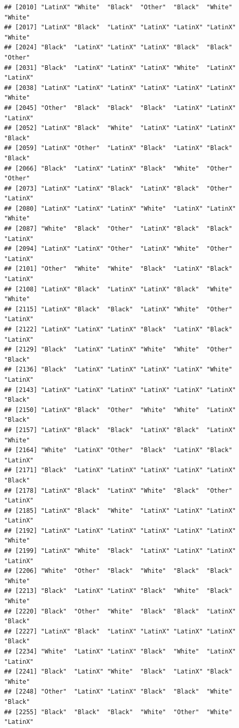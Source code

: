 \documentclass[]{book}
\begin{document}
\begin{verbatim}
## [2010] "LatinX" "White"  "Black"  "Other"  "Black"  "White"  "White" 
## [2017] "LatinX" "Black"  "LatinX" "LatinX" "LatinX" "LatinX" "White" 
## [2024] "Black"  "LatinX" "LatinX" "LatinX" "Black"  "Black"  "Other" 
## [2031] "Black"  "LatinX" "LatinX" "LatinX" "White"  "LatinX" "LatinX"
## [2038] "LatinX" "LatinX" "LatinX" "LatinX" "LatinX" "LatinX" "White" 
## [2045] "Other"  "Black"  "Black"  "Black"  "LatinX" "LatinX" "LatinX"
## [2052] "LatinX" "Black"  "White"  "LatinX" "LatinX" "LatinX" "Black" 
## [2059] "LatinX" "Other"  "LatinX" "Black"  "LatinX" "Black"  "Black" 
## [2066] "Black"  "LatinX" "LatinX" "Black"  "White"  "Other"  "Other" 
## [2073] "LatinX" "LatinX" "Black"  "LatinX" "Black"  "Other"  "LatinX"
## [2080] "LatinX" "LatinX" "LatinX" "White"  "LatinX" "LatinX" "White" 
## [2087] "White"  "Black"  "Other"  "LatinX" "Black"  "Black"  "LatinX"
## [2094] "LatinX" "LatinX" "Other"  "LatinX" "White"  "Other"  "LatinX"
## [2101] "Other"  "White"  "White"  "Black"  "LatinX" "Black"  "LatinX"
## [2108] "LatinX" "Black"  "LatinX" "LatinX" "Black"  "White"  "White" 
## [2115] "LatinX" "Black"  "Black"  "LatinX" "White"  "Other"  "LatinX"
## [2122] "LatinX" "LatinX" "LatinX" "Black"  "LatinX" "Black"  "LatinX"
## [2129] "Black"  "LatinX" "LatinX" "White"  "White"  "Other"  "Black" 
## [2136] "Black"  "LatinX" "LatinX" "LatinX" "LatinX" "White"  "LatinX"
## [2143] "LatinX" "LatinX" "LatinX" "LatinX" "LatinX" "LatinX" "Black" 
## [2150] "LatinX" "Black"  "Other"  "White"  "White"  "LatinX" "Black" 
## [2157] "LatinX" "Black"  "Black"  "LatinX" "Black"  "LatinX" "White" 
## [2164] "White"  "LatinX" "Other"  "Black"  "LatinX" "Black"  "LatinX"
## [2171] "Black"  "LatinX" "LatinX" "LatinX" "LatinX" "LatinX" "Black" 
## [2178] "LatinX" "Black"  "LatinX" "White"  "Black"  "Other"  "LatinX"
## [2185] "LatinX" "Black"  "White"  "LatinX" "LatinX" "LatinX" "LatinX"
## [2192] "LatinX" "LatinX" "LatinX" "LatinX" "LatinX" "LatinX" "White" 
## [2199] "LatinX" "White"  "Black"  "LatinX" "LatinX" "LatinX" "LatinX"
## [2206] "White"  "Other"  "Black"  "White"  "Black"  "Black"  "White" 
## [2213] "Black"  "LatinX" "LatinX" "Black"  "White"  "Black"  "White" 
## [2220] "Black"  "Other"  "White"  "Black"  "Black"  "LatinX" "Black" 
## [2227] "LatinX" "Black"  "LatinX" "LatinX" "LatinX" "LatinX" "Black" 
## [2234] "White"  "LatinX" "LatinX" "Black"  "White"  "LatinX" "LatinX"
## [2241] "Black"  "LatinX" "White"  "Black"  "LatinX" "Black"  "White" 
## [2248] "Other"  "LatinX" "LatinX" "Black"  "Black"  "White"  "Black" 
## [2255] "Black"  "Black"  "Black"  "White"  "Other"  "White"  "LatinX"

\end{verbatim}
\end{document}
